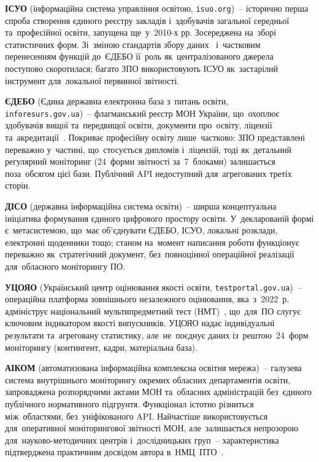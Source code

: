 \textbf{ІСУО} (інформаційна система управління освітою, \texttt{isuo.org})~-- історично перша спроба створення єдиного реєстру закладів і~здобувачів загальної середньої та~професійної освіти, запущена ще~у~2010-х рр. Зосереджена на~зборі статистичних форм. Зі~зміною стандартів збору даних~\cite{Bieliaieva2020InfoMech} і~частковим перенесенням функцій до~ЄДЕБО її~роль як~централізованого джерела поступово скоротилася; багато ЗПО використовують ІСУО як~застарілий інструмент для~локальної первинної звітності.

\textbf{ЄДЕБО} (Єдина державна електронна база з~питань освіти, \texttt{inforesurs.gov.ua})~-- флагманський реєстр МОН України, що~охоплює здобувачів вищої та~передвищої освіти, документи про~освіту, ліцензії та~акредитації~\cite{Khozhylo2024PublicMgmt}. Покриває професійну освіту лише~частково: ЗПО представлені переважно у~частині, що~стосується дипломів і~ліцензій, тоді як~детальний регулярний моніторинг (24~форми звітності за~7~блоками) залишається поза~обсягом цієї бази. Публічний API недоступний для~агрегованих третіх сторін.

\textbf{ДІСО} (державна інформаційна система освіти)~-- ширша концептуальна ініціатива формування єдиного цифрового простору освіти. У~декларованій формі є~метасистемою, що~має об'єднувати ЄДЕБО, ІСУО, локальні розклади, електронні щоденники тощо; станом на~момент написання роботи функціонує переважно як~стратегічний документ, без~повноцінної операційної реалізації для~обласного моніторингу ПО.

\textbf{УЦОЯО} (Український центр оцінювання якості освіти, \texttt{testportal.gov.ua})~-- операційна платформа зовнішнього незалежного оцінювання, яка~з~2022~р. адмініструє національний мультипредметний тест (НМТ)~\cite{Shatalovych2025NMT}, що~для~ПО слугує ключовим індикатором якості випускників. УЦОЯО надає індивідуальні результати та~агреговану статистику, але~не~поєднує даних із~рештою~24~форм моніторингу (контингент, кадри, матеріальна база).

\textbf{АІКОМ} (автоматизована інформаційна комплексна освітня мережа)~-- галузева система внутрішнього моніторингу окремих обласних департаментів освіти, запроваджена розпорядчими актами МОН та~обласних адміністрацій без~єдиного публічного нормативного підгрунтя. Функціонал істотно різниться між~областями, без~уніфікованого API. Найчастіше використовується для~оперативної моніторингової звітності МОН, але~залишається непрозорою для~науково-методичних центрів і~дослідницьких груп~-- характеристика підтверджена практичним досвідом автора в~НМЦ~ПТО~\cite{NMTsPTO2025}.

